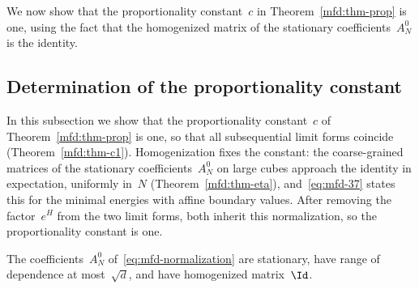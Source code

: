 \documentclass[11pt]{amsart}
\begin{document}
We now show that the proportionality constant~$c$ in Theorem~\ref{mfd:thm-prop} is one, using the fact that the homogenized matrix of the stationary coefficients~$A_N^0$ is the identity.

\subsection{Determination of the proportionality constant}
\label{mfd:sec-scalar}

In this subsection we show that the proportionality constant~$c$ of Theorem~\ref{mfd:thm-prop} is one, so that all subsequential limit forms coincide (Theorem~\ref{mfd:thm-c1}). Homogenization fixes the constant: the coarse-grained matrices of the stationary coefficients~$A_N^0$ on large cubes approach the identity in expectation, uniformly in~$N$ (Theorem~\ref{mfd:thm-eta}), and~\eqref{eq:mfd-37} states this for the minimal energies with affine boundary values. After removing the factor~$e^H$ from the two limit forms, both inherit this normalization, so the proportionality constant is one.

\smallskip

The coefficients~$A_N^0$ of~\eqref{eq:mfd-normalization} are stationary, have range of dependence at most~$\sqrt d$, and have homogenized matrix~$\Id$.
\end{document}
